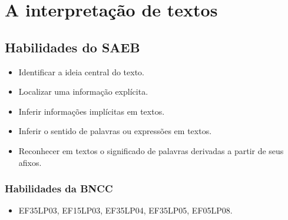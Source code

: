 \chapter{A interpretação de textos}


\section*{Habilidades do SAEB}

\begin{itemize}
\item Identificar a ideia central do texto.

\item Localizar uma informação explícita.

\item Inferir informações implícitas em textos.

\item Inferir o sentido de palavras ou expressões em textos.

\item Reconhecer em textos o significado de palavras derivadas a partir de
seus afixos.
\end{itemize}

\subsection{Habilidades da BNCC}

\begin{itemize}
\item EF35LP03, EF15LP03, EF35LP04, EF35LP05, EF05LP08.
\end{itemize}

